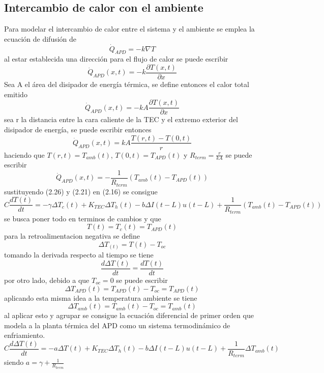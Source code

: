 \subsection{Intercambio de calor con el ambiente}
Para modelar el intercambio de calor entre el sistema y el ambiente se emplea la ecuación de difusión de 
\begin{equation}
    \dot{Q}_{APD} = -k\nabla T
\end{equation}
al estar establecida una dirección para el  flujo de calor se puede escribir 
\begin{equation}
    \dot{Q}_{APD}(x,t)=-k\frac{\partial T(x,t)}{\partial x}
\end{equation}
Sea A el área del disipador de energía térmica, se define entonces el calor total emitido 
\begin{equation}
     \dot{Q}_{APD}(x,t)=-kA\frac{\partial T(x,t)}{\partial x}
\end{equation}
sea r la distancia entre la cara caliente de la TEC y el extremo exterior del disipador de energía, se puede escribir entonces 
\begin{equation}
    \dot{Q}_{APD}(x,t)=kA\frac{T(r,t)-T(0,t)}{r}
\end{equation}
haciendo que $T(r,t)=T_{amb}(t)$, $T(0,t)=T_{APD}(t)$ y $R_{term}=\frac{r}{kA}$ se puede escribir 
\begin{equation}
     \dot{Q}_{APD}(x,t)=-\frac{1}{R_{term}}(T_{amb}(t)-T_{APD}(t))
\end{equation}
sustituyendo (2.26) y (2.21) en (2.16) se consigue
\begin{equation}
    C\frac{dT(t)}{dt} =  - \gamma \Delta T_{c}(t)+K_{TEC}\Delta T_{h}(t) - b\Delta I(t-L)u(t-L) + \frac{1}{R_{term}}(T_{amb}(t)-T_{APD}(t))
\end{equation}
se busca poner todo en terminos de cambios y que  
\begin{equation}
    T(t)=T_{c}(t)=T_{APD}(t)
\end{equation}
para la retroalimentacion negativa se define 
\begin{equation}
    \Delta T_(t) = T(t)-T_{oc}
\end{equation}
tomando la derivada respecto al tiempo se tiene 
\begin{equation}
    \frac{d\Delta T(t)}{dt} = \frac{dT(t)}{dt}
\end{equation}
por otro lado, debido a que $T_{oc}= 0$ se puede escribir 
\begin{equation}
    \Delta T_{APD}(t) = T_{APD}(t)-T_{oc} = T_{APD}(t)
\end{equation}
aplicando esta misma idea a la temperatura ambiente se tiene 
\begin{equation}
    \Delta T_{amb}(t) = T_{amb}(t)-T_{oc} = T_{amb}(t)
\end{equation}
al aplicar esto y agrupar se consigue la ecuación diferencial de primer orden que modela a la planta térmica del APD como un sistema termodinámico de enfriamiento. 
\begin{equation}
    C\frac{d\Delta T(t)}{dt} = -a\Delta T(t) + K_{TEC}\Delta T_{h}(t) - b\Delta I(t-L)u(t-L)+ \frac{1}{R_{term}}\Delta T_{amb}(t)
\end{equation}
siendo $a = \gamma+\frac{1}{R_{term}}$
